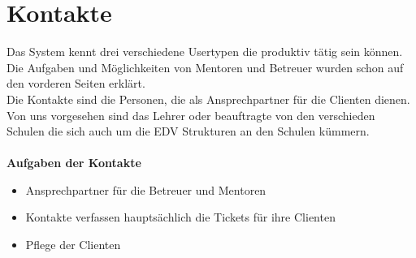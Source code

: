\chapter{Kontakte}  %
\label{chapter:Kontakte}  %

Das System kennt drei verschiedene Usertypen die produktiv tätig sein können. Die Aufgaben und Möglichkeiten von Mentoren und Betreuer wurden schon auf den vorderen Seiten erklärt. \\
Die Kontakte sind die Personen, die als Ansprechpartner für die Clienten dienen. Von uns vorgesehen sind das Lehrer oder beauftragte von den verschieden Schulen die sich auch um die EDV Strukturen an den Schulen kümmern. \\
\\
\textbf{Aufgaben der Kontakte}\\
\begin{itemize}
\item Ansprechpartner für die Betreuer und Mentoren 
\item Kontakte verfassen hauptsächlich die Tickets für ihre Clienten
\item Pflege der Clienten  
\end{itemize}
 
